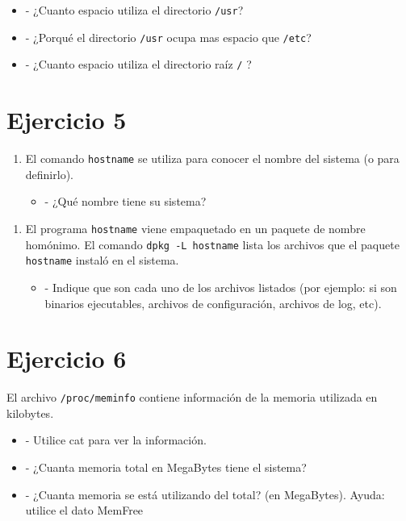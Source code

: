 \documentclass[12pt]{article}
\begin{document}
\begin{itemize}
\item - ¿Cuanto espacio utiliza el directorio \texttt{/usr}?
\item - ¿Porqué el directorio \texttt{/usr} ocupa mas espacio que \texttt{/etc}?
\item - ¿Cuanto espacio utiliza el directorio raíz \texttt{/} ?
\end{itemize}


\section*{Ejercicio 5}
\begin{enumerate}
\item El comando \texttt{hostname} se utiliza para conocer el nombre del sistema (o para definirlo).
\begin{itemize}
\item - ¿Qué nombre tiene su sistema?
\end{itemize}
\end{enumerate}

\begin{enumerate}
\item El programa \texttt{hostname} viene empaquetado en un paquete de nombre homónimo.
El comando \texttt{dpkg -L hostname}  lista los archivos que el paquete \texttt{hostname} instaló en el sistema.
\begin{itemize}
\item - Indique que son cada uno de los archivos listados (por ejemplo: si son binarios ejecutables, archivos de configuración, archivos de log, etc).
\end{itemize}
\end{enumerate}



\section*{Ejercicio 6}
El archivo \texttt{/proc/meminfo} contiene información de la memoria utilizada en kilobytes.

\begin{itemize}
\item - Utilice cat para ver la información.
\item - ¿Cuanta memoria total en MegaBytes tiene el sistema?
\item - ¿Cuanta memoria se está utilizando del total? (en MegaBytes). Ayuda: utilice el dato MemFree
\end{itemize}
\end{document}
